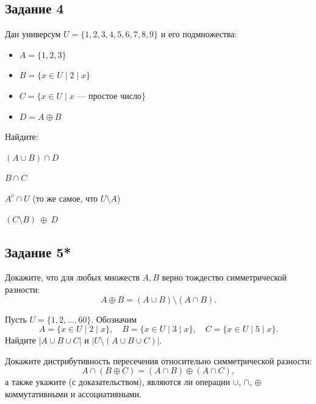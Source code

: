 \documentclass[a4paper,12pt,oneside]{article}
\newcommand{\Task}[1]{%
  \subsection*{#1}%
  \vspace{-0.2\baselineskip}%
}
\begin{document}
\Task{Задание 4}
Дан универсум $U=\{1,2,3,4,5,6,7,8,9\}$ и его подмножества:
\begin{itemize}
    \item $A=\{1,2,3\}$
    \item $B=\{x\in U \mid 2\mid x\}$
    \item $C=\{x\in U \mid x \text{ — простое число}\}$
    \item $D=A\oplus B$
\end{itemize}
Найдите:
\begin{numlist}
    \item $(A \cup B)\cap D$
    \item $B \cap C$
    \item $A^{c}\cap U$ \quad(то же самое, что $U\setminus A$)
    \item $(C \setminus B)\ \oplus\ D$
\end{numlist}

\Task{Задание 5*}
\begin{numlist}
    \item Докажите, что для любых множеств $A,B$ верно тождество симметрической разности:
    \[
       A\oplus B=(A\cup B)\setminus(A\cap B).
    \]
    \item Пусть $U=\{1,2,\dots,60\}$. Обозначим
    \[
      A=\{x\in U \mid 2\mid x\},\quad
      B=\{x\in U \mid 3\mid x\},\quad
      C=\{x\in U \mid 5\mid x\}.
    \]
    Найдите $|A\cup B\cup C|$ и $|U\setminus(A\cup B\cup C)|$.
    \item Докажите дистрибутивность пересечения относительно симметрической разности:
    \[
      A\cap(B\oplus C)=(A\cap B)\oplus(A\cap C),
    \]
    а также укажите (с доказательством), являются ли операции $\cup$, $\cap$, $\oplus$ коммутативными и ассоциативными.
\end{numlist}
\end{document}
